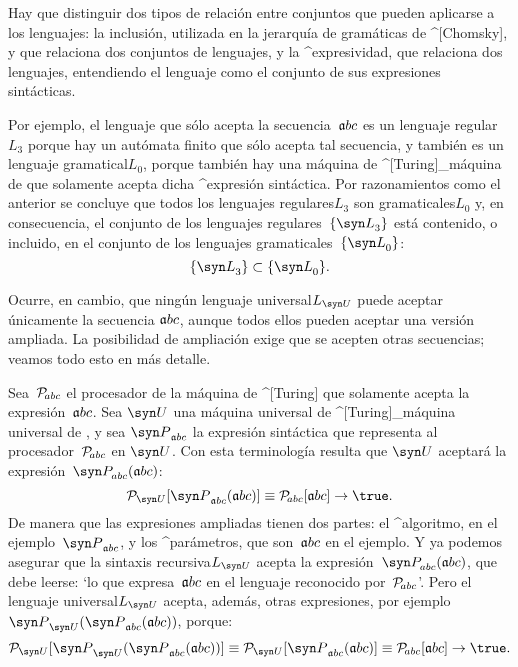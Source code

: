 Hay que distinguir dos tipos de relación entre conjuntos que pueden
aplicarse a los lenguajes: la inclusión, utilizada en la jerarquía de
gramáticas de ^[Chomsky], y que relaciona dos conjuntos de lenguajes, y
la ^{expresividad}, que relaciona dos lenguajes, entendiendo el lenguaje
como el conjunto de sus expresiones sintácticas.

Por ejemplo, el lenguaje que sólo acepta la secuencia~$\frak abc$ es un
\Mental lenguaje regular$L_3$ porque hay un autómata finito que sólo
acepta tal secuencia, y también es un \Mental lenguaje gramatical$L_0$,
porque también hay una
 máquina de ^[Turing]_{máquina de \string\string\string\vperson[Turing]}
que solamente acepta dicha ^{expresión sintáctica}. Por razonamientos
como el anterior se concluye que todos los \mental lenguajes
regulares$L_3$ son \mental gramaticales$L_0$ y, en consecuencia, el
conjunto de los lenguajes regulares~$\{ {\syn L}_3 \}$ está contenido, o
incluido, en el conjunto de los lenguajes gramaticales~$\{{\syn L}_0\}$:
$$ \{ {\syn L}_3 \} \subset \{ {\syn L}_0 \} .$$

Ocurre, en cambio, que ningún \Mental lenguaje universal$L_{\syn U}$
puede aceptar únicamente la secuencia $\frak abc$, aunque todos ellos
pueden aceptar una versión ampliada. La posibilidad de ampliación exige
que se acepten otras secuencias; veamos todo esto en más detalle.

Sea~${\cal P}_{\frak\!abc}$ el procesador de la máquina de ^[Turing] que
solamente acepta la expresión~$\frak abc$. Sea $\syn U$ una
 máquina universal de ^[Turing]_{máquina universal de
 \string\string\string\vperson[Turing]},
y sea ${\syn P}_{\frak abc}$ la expresión sintáctica que representa al
procesador~${\cal P}_{\frak\!abc}$ en $\syn U$. Con esta terminología
resulta que $\syn U$ aceptará la expresión~${\syn P}_{\frak\!abc}({\frak
abc})$:
$${\cal P}_{\syn U}[{\syn P}_{\frak abc}({\frak abc})] \equiv
  {\cal P}_{\frak\!abc}[{\frak abc}] \rightarrow \true .
$$
De manera que las expresiones ampliadas tienen dos partes: el
^{algoritmo}, en el ejemplo~${\syn P}_{\frak abc}$, y los ^{parámetros},
que son~$\frak abc$ en el ejemplo. Y ya podemos asegurar que la \Mental
sintaxis recursiva$L_{\syn U}$ acepta la expresión~${\syn
P}_{\frak\!abc}({\frak abc})$, que debe leerse: `lo que expresa~$\frak
abc$ en el lenguaje reconocido por~${\cal P}_{\frak\!abc}$'. Pero el
\mental lenguaje universal$L_{\syn U}$ acepta, además, otras
expresiones, por ejemplo
 ${\syn P}_{\syn U}({\syn P}_{\frak abc}({\frak abc}))$, porque:
$${\cal P}_{\syn U}[{\syn P}_{\syn U}({\syn P}_{\frak abc}({\frak abc}))]
  \equiv {\cal P}_{\syn U}[{\syn P}_{\frak abc}({\frak abc})] \equiv
   {\cal P}_{\frak\! abc}[{\frak abc}] \rightarrow \true .$$

